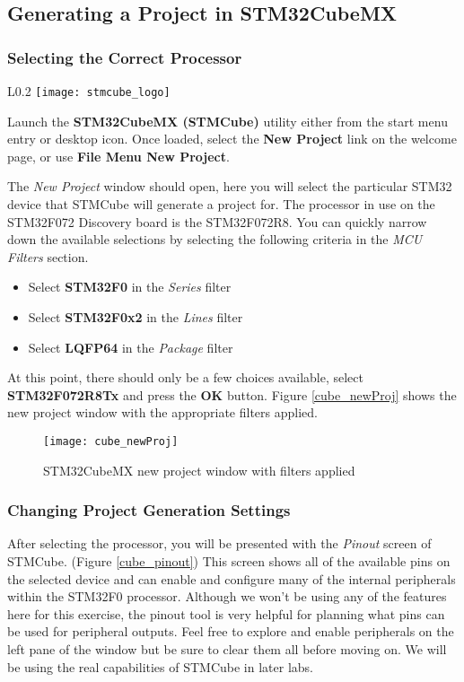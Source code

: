 \documentclass[11pt,fleqn]{book} %
\begin{document}
\subsection{Generating a Project in STM32CubeMX}
\subsubsection*{Selecting the Correct Processor}
\begin{wrapfigure}{L}{0.2\textwidth}
	\centering\texttt{[image: stmcube\_logo]}
\end{wrapfigure}

Launch the \textbf{STM32CubeMX (STMCube)} utility either from the start menu entry or desktop icon. Once loaded, select the \textbf{New Project} link on the welcome page, or use \textbf{File Menu \textrightarrow New Project}.

\noindent
The \textit{New Project} window should open, here you will select the particular STM32 device that STMCube will generate a project for. The processor in use on the STM32F072 Discovery board is the STM32F072R8. You can quickly narrow down the available selections by selecting the following criteria in the \textit{MCU Filters} section.
\begin{itemize}
	\item Select \textbf{STM32F0} in the \textit{Series} filter
	\item Select \textbf{STM32F0x2} in the \textit{Lines} filter
	\item Select \textbf{LQFP64} in the \textit{Package} filter
\end{itemize}
At this point, there should only be a few choices available, select \textbf{STM32F072R8Tx} and press the \textbf{OK} button. Figure \vref{cube_newProj} shows the new project window with the appropriate filters applied.

\begin{figure}[h]
	\centering\texttt{[image: cube\_newProj]}
	\caption{STM32CubeMX new project window with filters applied}
	\label{cube_newProj}
\end{figure}


\subsubsection*{Changing Project Generation Settings}

After selecting the processor, you will be presented with the \textit{Pinout} screen of STMCube. (Figure \vref{cube_pinout}) This screen shows all of the available pins on the selected device and can enable and configure many of the internal peripherals within the STM32F0 processor. Although we won't be using any of the features here for this exercise, the pinout tool is very helpful for planning what pins can be used for peripheral outputs. Feel free to explore and enable peripherals on the left pane of the window but be sure to clear them all before moving on. We will be using the real capabilities of STMCube in later labs.
\end{document}
